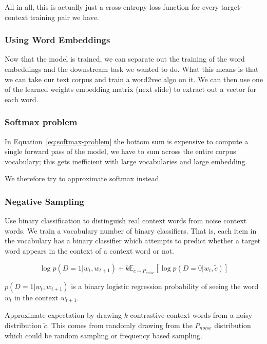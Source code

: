 \documentclass[11pt]{article}
\begin{document}
All in all, this is actually just a cross-entropy loss function for every target-context training pair we have.

\subsubsection{Using Word Embeddings}

Now that the model is trained, we can separate out the training of the word embeddings and the downstream task we wanted to do. What this means is that we can take our text corpus and train a word2vec algo on it. We can then use one of the learned weights embedding matrix (next slide) to extract out a vector for each word.

\subsubsection{Softmax problem}

In Equation~\ref{eq:softmax-problem} the bottom sum is expensive to compute a single forward pass of the model, we have to sum across the entire corpus vocabulary; this gets inefficient with large vocabularies and large embedding.

We therefore try to approximate softmax instead.

\subsubsection{Negative Sampling}

Use binary classification to distinguish real context words from noise context words. We train a vocabulary number of binary classifiers. That is, each item in the vocabulary has a binary classifier which attempts to predict whether a target word appears in the context of a context word or not.

\begin{equation*}
    \log p(D=1|w_t , w_{t+1}) + k \mathbb{E}_{\tilde{c}\sim P_{noise}}\left[\log p(D=0|w_t, \tilde{c})\right]
\end{equation*}

$p(D=1|w_t, w_{t+1})$ is a binary logistic regression probability of seeing the word $w_t$ in the context $w_{t+1}$.

Approximate expectation by drawing $k$ contrastive context words from a noisy distribution $\tilde{c}$. This comes from randomly drawing from the $P_{noise}$ distribution which could be random sampling or frequency based sampling.
\end{document}
